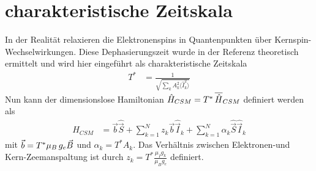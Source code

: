 \section{charakteristische Zeitskala}
In der Realität relaxieren die Elektronenspins in Quantenpunkten über Kernspin-Wechselwirkungen. Diese Dephasierungszeit wurde in der 
Referenz \cite{PhysRevB.65.205309} theoretisch ermittelt und wird hier eingeführt als charakteristische Zeitskala
\begin{align}
    T^* &= \frac{1}{\sqrt{\sum_k A_k^2\langle \hat{I}_k^2 \rangle}}
\end{align}
Nun kann der dimensionslose Hamiltonian $\hat{H}_{CSM} = T^*\thinspace\overline{\hat{H}}_{CSM}$ definiert werden als
\begin{align}
    \hat{H}_{CSM} &= \vec{b}\hat{\vec{S}} +  \sum_{k=1}^{N}z_k\vec{b}\hat{\vec{I}}_k + \sum_{k=1}^{N} \alpha_k \hat{\vec{S}}\hat{\vec{I}}_k
\end{align}
mit $\vec{b}=T^*\mu_B\thinspace g_e \vec{B}$ und $\alpha_k = T^* A_k$. Das Verhältnis zwischen Elektronen-und Kern-Zeemanspaltung ist 
durch $z_k=T^*\frac{\mu_I g_k}{\mu_B g_e}$ definiert.


